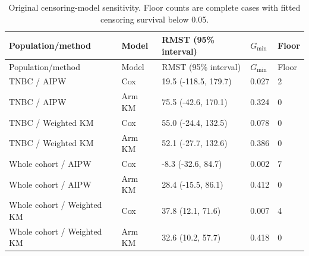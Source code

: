 \documentclass[12pt,letterpaper]{article}
\begin{document}
\begin{longtable}{p{1.7in}p{0.65in}p{2.25in}p{0.65in}p{0.55in}}
\caption{Original censoring-model sensitivity. Floor counts are complete cases with fitted censoring survival below 0.05.}\\
\toprule
Population/method & Model & RMST (95\% interval) & $G_{\min}$ & Floor \\
\midrule\endfirsthead
\toprule
Population/method & Model & RMST (95\% interval) & $G_{\min}$ & Floor \\
\midrule\endhead
\bottomrule\endfoot
TNBC / AIPW & Cox & 19.5 (-118.5, 179.7) & 0.027 & 2 \\
TNBC / AIPW & Arm KM & 75.5 (-42.6, 170.1) & 0.324 & 0 \\
TNBC / Weighted KM & Cox & 55.0 (-24.4, 132.5) & 0.078 & 0 \\
TNBC / Weighted KM & Arm KM & 52.1 (-27.7, 132.6) & 0.386 & 0 \\
Whole cohort / AIPW & Cox & -8.3 (-32.6, 84.7) & 0.002 & 7 \\
Whole cohort / AIPW & Arm KM & 28.4 (-15.5, 86.1) & 0.412 & 0 \\
Whole cohort / Weighted KM & Cox & 37.8 (12.1, 71.6) & 0.007 & 4 \\
Whole cohort / Weighted KM & Arm KM & 32.6 (10.2, 57.7) & 0.418 & 0 \\
\end{longtable}
\end{document}

